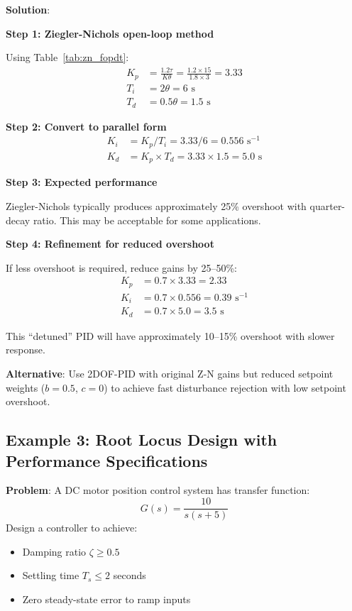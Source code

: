 \textbf{Solution}:

\textbf{Step 1: Ziegler-Nichols open-loop method}

Using Table~\ref{tab:zn_fopdt}:
\begin{align}
K_p &= \frac{1.2\tau}{K\theta} = \frac{1.2 \times 15}{1.8 \times 3} = 3.33 \\
T_i &= 2\theta = 6 \text{ s} \\
T_d &= 0.5\theta = 1.5 \text{ s}
\end{align}

\textbf{Step 2: Convert to parallel form}
\begin{align}
K_i &= K_p/T_i = 3.33/6 = 0.556 \text{ s}^{-1} \\
K_d &= K_p \times T_d = 3.33 \times 1.5 = 5.0 \text{ s}
\end{align}

\textbf{Step 3: Expected performance}

Ziegler-Nichols typically produces approximately 25\% overshoot with quarter-decay ratio. This may be acceptable for some applications.

\textbf{Step 4: Refinement for reduced overshoot}

If less overshoot is required, reduce gains by 25--50\%:
\begin{align}
K_p &= 0.7 \times 3.33 = 2.33 \\
K_i &= 0.7 \times 0.556 = 0.39 \text{ s}^{-1} \\
K_d &= 0.7 \times 5.0 = 3.5 \text{ s}
\end{align}

This ``detuned'' PID will have approximately 10--15\% overshoot with slower response.

\textbf{Alternative}: Use 2DOF-PID with original Z-N gains but reduced setpoint weights ($b = 0.5$, $c = 0$) to achieve fast disturbance rejection with low setpoint overshoot.

\subsection{Example 3: Root Locus Design with Performance Specifications}
\label{subsec:ex_root_locus_specs}

\textbf{Problem}: A DC motor position control system has transfer function:
\begin{equation}
G(s) = \frac{10}{s(s + 5)}
\end{equation}
Design a controller to achieve:
\begin{itemize}
    \item Damping ratio $\zeta \geq 0.5$
    \item Settling time $T_s \leq 2$ seconds
    \item Zero steady-state error to ramp inputs
\end{itemize}

